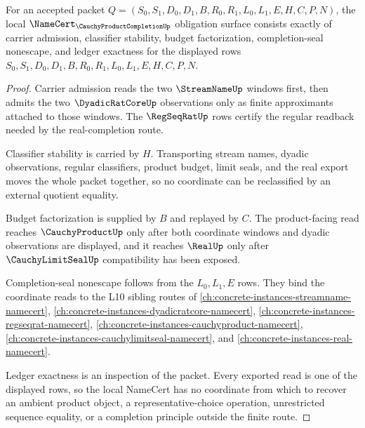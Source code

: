 \begin{theorem}
\label{thm:cauchy-product-completion-namecert-obligations}
For an accepted packet $Q=(S_0,S_1,D_0,D_1,B,R_0,R_1,L_0,L_1,E,H,C,P,N)$, the local $\NameCert_{\CauchyProductCompletionUp}$ obligation surface consists exactly of carrier admission, classifier stability, budget factorization, completion-seal nonescape, and ledger exactness for the displayed rows $S_0,S_1,D_0,D_1,B,R_0,R_1,L_0,L_1,E,H,C,P,N$.
\end{theorem}
\begin{proof}
Carrier admission reads the two $\StreamNameUp$ windows first, then admits the two $\DyadicRatCoreUp$ observations only as finite approximants attached to those windows. The $\RegSeqRatUp$ rows certify the regular readback needed by the real-completion route.

Classifier stability is carried by $H$. Transporting stream names, dyadic observations, regular classifiers, product budget, limit seals, and the real export moves the whole packet together, so no coordinate can be reclassified by an external quotient equality.

Budget factorization is supplied by $B$ and replayed by $C$. The product-facing read reaches $\CauchyProductUp$ only after both coordinate windows and dyadic observations are displayed, and it reaches $\RealUp$ only after $\CauchyLimitSealUp$ compatibility has been exposed.

Completion-seal nonescape follows from the $L_0,L_1,E$ rows. They bind the coordinate reads to the L10 sibling routes of \autoref{ch:concrete-instances-streamname-namecert}, \autoref{ch:concrete-instances-dyadicratcore-namecert}, \autoref{ch:concrete-instances-regseqrat-namecert}, \autoref{ch:concrete-instances-cauchyproduct-namecert}, \autoref{ch:concrete-instances-cauchylimitseal-namecert}, and \autoref{ch:concrete-instances-real-namecert}.

Ledger exactness is an inspection of the packet. Every exported read is one of the displayed rows, so the local NameCert has no coordinate from which to recover an ambient product object, a representative-choice operation, unrestricted sequence equality, or a completion principle outside the finite route.
\end{proof}

